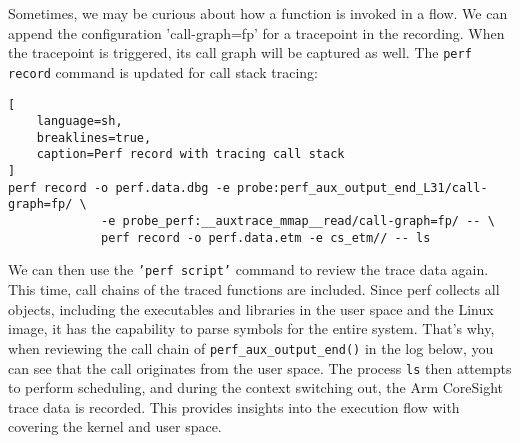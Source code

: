\documentclass[11pt]{diazessay} %
\def\code#1{\texttt{#1}}
\begin{document}
Sometimes, we may be curious about how a function is invoked in a flow. We can
append the configuration 'call-graph=fp' for a tracepoint in the recording.
When the tracepoint is triggered, its call graph will be captured as well.
The \code{perf record} command is updated for call stack tracing:

\begin{lstlisting}[
  	language=sh,
	breaklines=true,
	caption=Perf record with tracing call stack
]
perf record -o perf.data.dbg -e probe:perf_aux_output_end_L31/call-graph=fp/ \
             -e probe_perf:__auxtrace_mmap__read/call-graph=fp/ -- \
             perf record -o perf.data.etm -e cs_etm// -- ls
\end{lstlisting}

We can then use the \code{'perf script'} command to review the trace data
again. This time, call chains of the traced functions are included. Since perf
collects all objects, including the executables and libraries in the user
space and the Linux image, it has the capability to parse symbols for the
entire system. That's why, when reviewing the call chain of
\code{perf\_aux\_output\_end()} in the log below, you can see that the call
originates from the user space. The process \code{ls} then attempts to
perform scheduling, and during the context switching out, the Arm CoreSight
trace data is recorded. This provides insights into the execution flow with
covering the kernel and user space.
\end{document}
